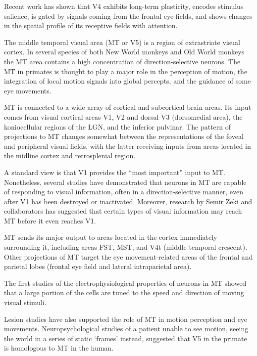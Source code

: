 \documentclass[]{book}
\begin{document}
Recent work has shown that V4 exhibits long-term plasticity, encodes stimulus salience, is gated by signals coming from the frontal eye fields, and shows changes in the spatial profile of its receptive fields with attention.

The middle temporal visual area (MT or V5) is a region of extrastriate visual cortex. In several species of both New World monkeys and Old World monkeys the MT area contains a high concentration of direction-selective neurons. The MT in primates is thought to play a major role in the perception of motion, the integration of local motion signals into global percepts, and the guidance of some eye movements.

MT is connected to a wide array of cortical and subcortical brain areas. Its input comes from visual cortical areas V1, V2 and dorsal V3 (dorsomedial area), the koniocellular regions of the LGN, and the inferior pulvinar. The pattern of projections to MT changes somewhat between the representations of the foveal and peripheral visual fields, with the latter receiving inputs from areas located in the midline cortex and retrosplenial region.

A standard view is that V1 provides the ``most important'' input to MT. Nonetheless, several studies have demonstrated that neurons in MT are capable of responding to visual information, often in a direction-selective manner, even after V1 has been destroyed or inactivated. Moreover, research by Semir Zeki and collaborators has suggested that certain types of visual information may reach MT before it even reaches V1.

MT sends its major output to areas located in the cortex immediately surrounding it, including areas FST, MST, and V4t (middle temporal crescent). Other projections of MT target the eye movement-related areas of the frontal and parietal lobes (frontal eye field and lateral intraparietal area).

The first studies of the electrophysiological properties of neurons in MT showed that a large portion of the cells are tuned to the speed and direction of moving visual stimuli.

Lesion studies have also supported the role of MT in motion perception and eye movements. Neuropsychological studies of a patient unable to see motion, seeing the world in a series of static `frames' instead, suggested that V5 in the primate is homologous to MT in the human.
\end{document}

